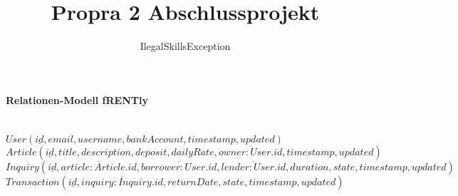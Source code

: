 \documentclass{article}
\begin{document}
\title{Propra 2 Abschlussprojekt}
\author{IlegalSkillsException}

\maketitle

\paragraph{Relationen-Modell fRENTly} \hspace{5pt} \\
\newline
$ User (\underline{id}, email, username, bankAccount, timestamp, updated)$ \newline \newline
$ Article (\underline{id}, title, description, deposit, dailyRate, \overline{owner:User.id}, timestamp, updated) $ \newline \newline
$ Inquiry (\underline{id}, \overline{article:Article.id}, \overline{borrower:User.id},\overline{lender:User.id}, duration, state, timestamp, updated) $ \newline \newline
$ Transaction (\underline{id}, \overline{inquiry:Inquiry.id}, returnDate, state, timestamp, updated) $ \newline \newline
\end{document}
